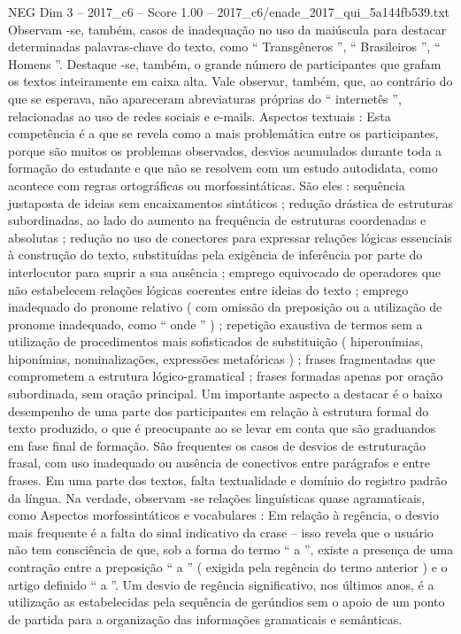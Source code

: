 \begin{textsample}{NEG Dim 3 – 2017\_c6 – Score 1.00 – 2017\_c6/enade\_2017\_qui\_5a144fb539.txt}
Observam -se, também, casos de inadequação no uso da maiúscula para destacar determinadas palavras-chave do texto, como “ Transgêneros ”, “ Brasileiros ”, “ Homens ”.
Destaque -se, também, o grande número de participantes que grafam os textos inteiramente em caixa alta.
Vale observar, também, que, ao contrário do que se esperava, não apareceram abreviaturas próprias do “ internetês ”, relacionadas ao uso de redes sociais e e-mails.
Aspectos textuais : Esta competência é a que se revela como a mais problemática entre os participantes, porque são muitos os problemas observados, desvios acumulados durante toda a formação do estudante e que não se resolvem com um estudo autodidata, como acontece com regras ortográficas ou morfossintáticas.
São eles : sequência justaposta de ideias sem encaixamentos sintáticos ; redução drástica de estruturas subordinadas, ao lado do aumento na frequência de estruturas coordenadas e absolutas ; redução no uso de conectores para expressar relações lógicas essenciais à construção do texto, substituídas pela exigência de inferência por parte do interlocutor para suprir a sua ausência ; emprego equivocado de operadores que não estabelecem relações lógicas coerentes entre ideias do texto ; emprego inadequado do pronome relativo ( com omissão da preposição ou a utilização de pronome inadequado, como “ onde ” ) ; repetição exaustiva de termos sem a utilização de procedimentos mais sofisticados de substituição ( hiperonímias, hiponímias, nominalizações, expressões metafóricas ) ; frases fragmentadas que comprometem a estrutura lógico-gramatical ; frases formadas apenas por oração subordinada, sem oração principal.
Um importante aspecto a destacar é o baixo desempenho de uma parte dos participantes em relação à estrutura formal do texto produzido, o que é preocupante ao se levar em conta que são graduandos em fase final de formação.
São frequentes os casos de desvios de estruturação frasal, com uso inadequado ou ausência de conectivos entre parágrafos e entre frases.
Em uma parte dos textos, falta textualidade e domínio do registro padrão da língua.
Na verdade, observam -se relações linguísticas quase agramaticais, como Aspectos morfossintáticos e vocabulares : Em relação à regência, o desvio mais frequente é a falta do sinal indicativo da crase – isso revela que o usuário não tem consciência de que, sob a forma do termo “ a ”, existe a presença de uma contração entre a preposição “ a ” ( exigida pela regência do termo anterior ) e o artigo definido “ a ”.
Um desvio de regência significativo, nos últimos anos, é a utilização as estabelecidas pela sequência de gerúndios sem o apoio de um ponto de partida para a organização das informações gramaticais e semânticas.

\end{textsample}
